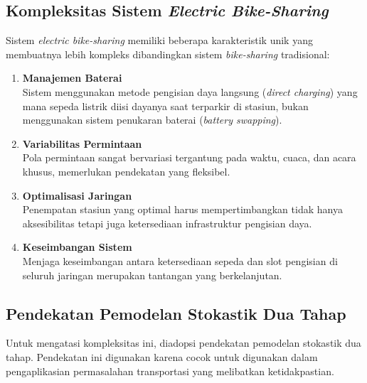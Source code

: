 \subsection{Kompleksitas Sistem \textit{Electric Bike-Sharing}}
Sistem \textit{electric bike-sharing} memiliki beberapa karakteristik unik yang membuatnya lebih kompleks dibandingkan sistem \textit{bike-sharing} tradisional:
\begin{enumerate}
    \item \textbf{Manajemen Baterai}\\ Sistem menggunakan metode pengisian daya langsung (\textit{direct charging}) yang mana sepeda listrik diisi dayanya saat terparkir di stasiun, bukan menggunakan sistem penukaran baterai (\textit{battery swapping}).
    \item \textbf{Variabilitas Permintaan}\\ Pola permintaan sangat bervariasi tergantung pada waktu, cuaca, dan acara khusus, memerlukan pendekatan yang fleksibel.
    \item \textbf{Optimalisasi Jaringan}\\ Penempatan stasiun yang optimal harus mempertimbangkan tidak hanya aksesibilitas tetapi juga ketersediaan infrastruktur pengisian daya.
    \item \textbf{Keseimbangan Sistem}\\ Menjaga keseimbangan antara ketersediaan sepeda dan slot pengisian di seluruh jaringan merupakan tantangan yang berkelanjutan.
\end{enumerate}

\subsection{Pendekatan Pemodelan Stokastik Dua Tahap}
Untuk mengatasi kompleksitas ini, diadopsi pendekatan pemodelan stokastik dua tahap. Pendekatan ini digunakan karena cocok untuk digunakan dalam pengaplikasian permasalahan transportasi yang melibatkan ketidakpastian.

